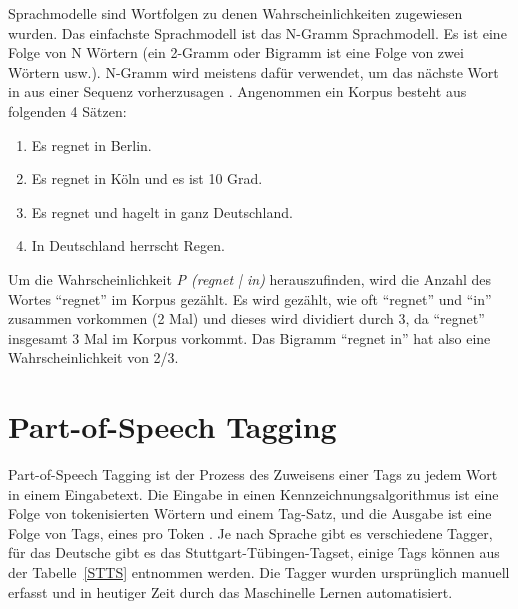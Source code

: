 Sprachmodelle sind Wortfolgen zu denen Wahrscheinlichkeiten zugewiesen wurden. Das einfachste Sprachmodell ist das N-Gramm Sprachmodell. Es ist eine Folge von N Wörtern (ein 2-Gramm oder Bigramm ist eine Folge von zwei Wörtern usw.). N-Gramm wird meistens dafür verwendet, um das nächste Wort in aus einer Sequenz vorherzusagen \cite*[31]{Jurafskya}. Angenommen ein Korpus besteht aus folgenden 4 Sätzen:

\begin{enumerate}
    \item Es regnet in Berlin.
    \item Es regnet in Köln und es ist 10 Grad.
    \item Es regnet und hagelt in ganz Deutschland.
    \item In Deutschland herrscht Regen.
\end{enumerate}

Um die Wahrscheinlichkeit \textit{P (regnet | in)} herauszufinden, wird die Anzahl des Wortes \enquote{regnet} im Korpus gezählt. Es wird gezählt, wie oft \enquote{regnet} und \enquote{in} zusammen vorkommen (2 Mal) und dieses wird dividiert durch 3, da \enquote{regnet} insgesamt 3 Mal im Korpus vorkommt. Das Bigramm \enquote{regnet in} hat also eine Wahrscheinlichkeit von 2/3.

\section{Part-of-Speech Tagging}
Part-of-Speech Tagging ist der Prozess des Zuweisens einer Tags zu jedem Wort in einem Eingabetext. Die Eingabe in einen Kennzeichnungsalgorithmus ist eine Folge von tokenisierten Wörtern und einem Tag-Satz, und die Ausgabe ist eine Folge von Tags, eines pro Token \cite*[148]{Jurafskya}. Je nach Sprache gibt es verschiedene Tagger, für das Deutsche gibt es das Stuttgart-Tübingen-Tagset\cite*{tagger}, einige Tags können aus der Tabelle~\ref{STTS} entnommen werden. Die Tagger wurden ursprünglich manuell erfasst und in heutiger Zeit durch das Maschinelle Lernen automatisiert.



